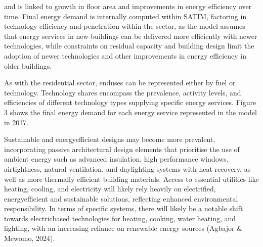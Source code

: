 \documentclass[letterpaper,10pt,english]{jupyterBook}
\begin{document}
\sphinxAtStartPar
{} and is linked to growth in floor area and improvements in energy efficiency over time. Final energy demand is internally computed within SATIM, factoring in technology efficiency and penetration within the sector, as the model assumes that energy services in new buildings can be delivered more efficiently with newer technologies, while constraints on residual capacity and building design limit the adoption of newer technologies and other improvements in energy efficiency in older buildings.

\sphinxAtStartPar
{} As with the residential sector, end\sphinxhyphen{}uses can be represented either by fuel or technology. Technology shares encompass the prevalence, activity levels, and efficiencies of different technology types supplying specific energy services. Figure 3 shows the final energy demand for each energy service represented in the model in 2017.

\sphinxAtStartPar
{}

\sphinxAtStartPar
{} Sustainable and energy\sphinxhyphen{}efficient designs may become more prevalent, incorporating passive architectural design elements that prioritise the use of ambient energy such as advanced insulation, high performance windows, airtightness, natural ventilation, and daylighting systems with heat recovery, as well as more thermally efficient building materials. Access to essential utilities like heating, cooling, and electricity will likely rely heavily on electrified, energy\sphinxhyphen{}efficient and sustainable solutions, reflecting enhanced environmental responsibility. In terms of specific systems, there will likely be a notable shift towards electric\sphinxhyphen{}based technologies for heating, cooking, water heating, and lighting, with an increasing reliance on renewable energy sources (Agbajor \& Mewomo, 2024).
\end{document}
